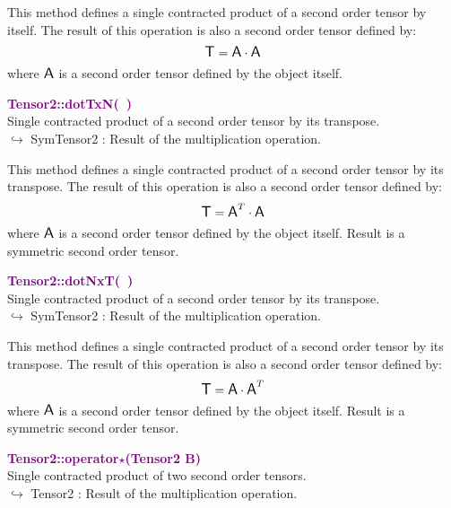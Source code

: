 This method defines a single contracted product of a second order tensor by itself.
The result of this operation is also a second order tensor defined by:
\begin{equation*}
\mbox{\large\ensuremath{\mathsf{T}}} = \mbox{\large\ensuremath{\mathsf{A}}} \cdot \mbox{\large\ensuremath{\mathsf{A}}}
\end{equation*}
where $\mbox{\large\ensuremath{\mathsf{A}}}$ is a second order tensor defined by the object itself.

\textcolor{purple}{\textbf{Tensor2::dotTxN(~)}}\label{Tensor2::dotTxN()}\\
Single contracted product of a second order tensor by its transpose.\\ \hspace*{10mm}$\hookrightarrow$ SymTensor2 : Result of the multiplication operation.

This method defines a single contracted product of a second order tensor by its transpose.
The result of this operation is also a second order tensor defined by:
\begin{equation*}
\mbox{\large\ensuremath{\mathsf{T}}} = \mbox{\large\ensuremath{\mathsf{A}}}^T\cdot \mbox{\large\ensuremath{\mathsf{A}}}
\end{equation*}
where $\mbox{\large\ensuremath{\mathsf{A}}}$ is a second order tensor defined by the object itself. Result is a symmetric second order tensor.

\textcolor{purple}{\textbf{Tensor2::dotNxT(~)}}\label{Tensor2::dotNxT()}\\
Single contracted product of a second order tensor by its transpose.\\ \hspace*{10mm}$\hookrightarrow$ SymTensor2 : Result of the multiplication operation.

This method defines a single contracted product of a second order tensor by its transpose.
The result of this operation is also a second order tensor defined by:
\begin{equation*}
\mbox{\large\ensuremath{\mathsf{T}}} = \mbox{\large\ensuremath{\mathsf{A}}} \cdot \mbox{\large\ensuremath{\mathsf{A}}}^T
\end{equation*}
where $\mbox{\large\ensuremath{\mathsf{A}}}$ is a second order tensor defined by the object itself. Result is a symmetric second order tensor.

\textcolor{purple}{\textbf{Tensor2::operator$\star$(Tensor2 B)}}\label{Tensor2::operator*(Tensor2 B)}\\
Single contracted product of two second order tensors.\\ \hspace*{10mm}$\hookrightarrow$ Tensor2 : Result of the multiplication operation.

